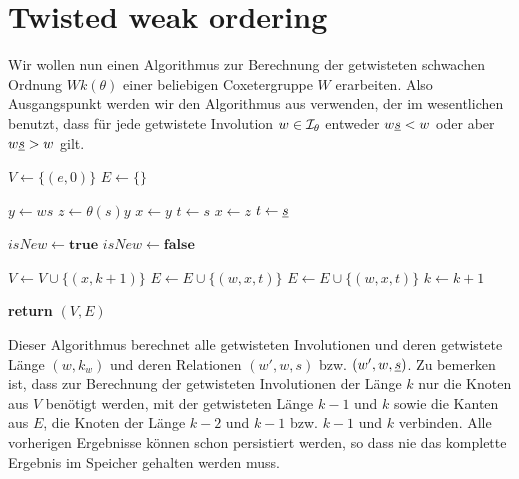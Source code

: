 \section{Twisted weak ordering}

Wir wollen nun einen Algorithmus zur Berechnung der getwisteten schwachen
Ordnung $Wk(\theta)$ einer beliebigen Coxetergruppe $W$ erarbeiten. Also
Ausgangspunkt werden wir den Algorithmus aus \cite[Algorithm 3.1.1]{haas:twoa}
verwenden, der im wesentlichen benutzt, dass für jede getwistete Involution $w
\in \mathcal{I}_{\theta}$ entweder $w \underline{s} < w$ oder aber $w \underline{s} > w$ gilt.

\begin{algo}[Algorithmus 1]
	\hfill
	\begin{algorithmic}[1]
	 
	\State $V \gets \{(e,0)\}$
	\State $E \gets \{\}$

			  \State $y \gets ws$
				\State $z \gets \theta(s)y$
					\State $x \gets y$ 
					\State $t \gets s$
				\Else
					\State $x \gets z$ 
					\State $t \gets \underline{s}$
				\EndIf
				
				\State $isNew \gets \textbf{true}$
				 
						\State $isNew \gets \textbf{false}$
					\EndIf
				\EndFor
				
					\State $V \gets V \cup \{ (x,k+1) \}$
					\State $E \gets E \cup \{ (w,x,t) \}$
				\Else
					\State $E \gets E \cup \{ (w,x,t) \}$
				\EndIf
			\EndFor
		\EndFor
		\State $k \gets k + 1$
	\EndFor

	\State \textbf{return} $(V,E)$
	\EndProcedure
	\end{algorithmic}
\end{algo}

Dieser Algorithmus berechnet alle getwisteten Involutionen und deren
getwistete Länge $(w,k_w)$ und deren Relationen $(w',w,s)$ bzw. $(w',w,\underline{s})$. Zu bemerken ist, dass zur Berechnung der ge\-twis\-te\-ten Involutionen der
Länge $k$ nur die Knoten aus $V$ benötigt werden, mit der getwisteten Länge $k-1$ und $k$ sowie
die Kanten aus $E$, die Knoten der Länge $k-2$ und $k-1$ bzw. $k-1$ und $k$
verbinden. Alle vorherigen Ergebnisse können schon persistiert werden, so dass
nie das komplette Ergebnis im Speicher gehalten werden muss.

